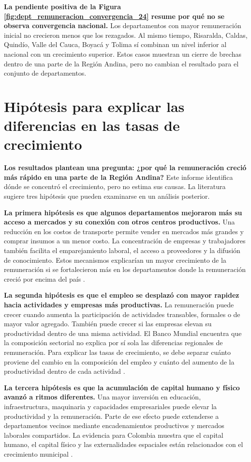 \textbf{La pendiente positiva de la Figura \ref{fig:dept_remuneracion_convergencia_24} resume por qué no se observa convergencia nacional.} Los departamentos con mayor remuneración inicial no crecieron menos que los rezagados. Al mismo tiempo, Risaralda, Caldas, Quindío, Valle del Cauca, Boyacá y Tolima sí combinan un nivel inferior al nacional con un crecimiento superior. Estos casos muestran un cierre de brechas dentro de una parte de la Región Andina, pero no cambian el resultado para el conjunto de departamentos.

\section{Hipótesis para explicar las diferencias en las tasas de crecimiento}

\textbf{Los resultados plantean una pregunta: ¿por qué la remuneración creció más rápido en una parte de la Región Andina?} Este informe identifica dónde se concentró el crecimiento, pero no estima sus causas. La literatura sugiere tres hipótesis que pueden examinarse en un análisis posterior.

\textbf{La primera hipótesis es que algunos departamentos mejoraron más su acceso a mercados y su conexión con otros centros productivos.} Una reducción en los costos de transporte permite vender en mercados más grandes y comprar insumos a un menor costo. La concentración de empresas y trabajadores también facilita el emparejamiento laboral, el acceso a proveedores y la difusión de conocimiento. Estos mecanismos explicarían un mayor crecimiento de la remuneración si se fortalecieron más en los departamentos donde la remuneración creció por encima del país \citep{grover2022,worldbank2025regional}.

\textbf{La segunda hipótesis es que el empleo se desplazó con mayor rapidez hacia actividades y empresas más productivas.} La remuneración puede crecer cuando aumenta la participación de actividades transables, formales o de mayor valor agregado. También puede crecer si las empresas elevan su productividad dentro de una misma actividad. El Banco Mundial encuentra que la composición sectorial no explica por sí sola las diferencias regionales de remuneración. Para explicar las tasas de crecimiento, se debe separar cuánto proviene del cambio en la composición del empleo y cuánto del aumento de la productividad dentro de cada actividad \citep{worldbank2025regional}.

\textbf{La tercera hipótesis es que la acumulación de capital humano y físico avanzó a ritmos diferentes.} Una mayor inversión en educación, infraestructura, maquinaria y capacidades empresariales puede elevar la productividad y la remuneración. Parte de ese efecto puede extenderse a departamentos vecinos mediante encadenamientos productivos y mercados laborales compartidos. La evidencia para Colombia muestra que el capital humano, el capital físico y las externalidades espaciales están relacionados con el crecimiento municipal \citep{galvis2016,diaz2013}.

